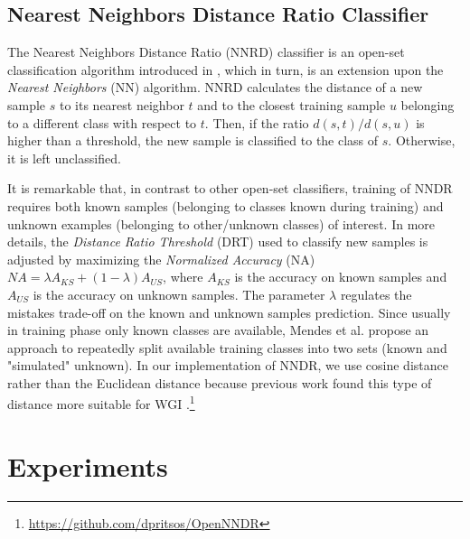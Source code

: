 \documentclass{llncs}
\begin{document}
\subsection{Nearest Neighbors Distance Ratio Classifier}\label{sec:NNRD_Description}

The Nearest Neighbors Distance Ratio (NNRD) classifier is an open-set classification algorithm introduced in \cite{mendesjunior2016}, which in turn, is an extension upon the \textit{Nearest Neighbors} (NN) algorithm. NNRD calculates the distance of a new sample $s$ to its nearest neighbor $t$ and to the closest training sample $u$ belonging to a different class with respect to $t$. Then, if the ratio $d(s,t)/d(s,u)$ is higher than a threshold, the new sample is classified to the class of $s$. Otherwise, it is left unclassified. 

It is remarkable that, in contrast to other open-set classifiers, training of NNDR requires both known samples (belonging to classes known during training) and unknown examples (belonging to other/unknown classes) of interest. In more details, the \textit{Distance Ratio Threshold} (DRT) used to classify new samples is adjusted by maximizing the \textit{Normalized Accuracy} (NA)  $NA = \lambda A_{KS} + (1 - \lambda) A_{US}$, where $A_{KS}$ is the accuracy on known samples and $A_{US}$ is the accuracy on unknown samples. The parameter $\lambda$ regulates the mistakes trade-off on the known and unknown samples prediction. Since usually in training phase only known classes are available, Mendes et al. \cite{mendesjunior2016} propose an approach to repeatedly split available training classes into two sets (known and "simulated" unknown). In our implementation of NNDR, we use cosine distance rather than the Euclidean distance because previous work found this type of distance more suitable for WGI \cite{pritsos2018open}.\footnote{\url{https://github.com/dpritsos/OpenNNDR}}

\section{Experiments}\label{sec:experiments}

\end{document}

